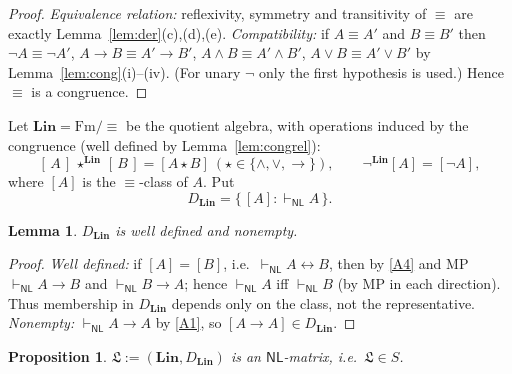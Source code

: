 \documentclass[12pt]{article}
\newtheorem{lemma}{Lemma}
\newtheorem{proposition}{Proposition}
\theoremstyle{definition}
\newcommand{\NL}{\mathsf{NL}}
\newcommand{\prv}{\vdash_{\NL}}
\newcommand{\Fm}{\mathrm{Fm}}
\newcommand{\imp}{\rightarrow}
\newcommand{\bic}{\leftrightarrow}
\newcommand{\Lin}{\mathbf{Lin}}
\begin{document}
\begin{proof}
\emph{Equivalence relation:} reflexivity, symmetry and transitivity of $\equiv$
are exactly Lemma~\ref{lem:der}(c),(d),(e).
\emph{Compatibility:} if $A\equiv A'$ and $B\equiv B'$ then
$\neg A\equiv\neg A'$, $A\imp B\equiv A'\imp B'$, $A\wedge B\equiv A'\wedge B'$,
$A\vee B\equiv A'\vee B'$ by Lemma~\ref{lem:cong}(i)--(iv). (For unary $\neg$
only the first hypothesis is used.) Hence $\equiv$ is a congruence.
\end{proof}

Let $\Lin=\Fm/{\equiv}$ be the quotient algebra, with operations induced by the
congruence (well defined by Lemma~\ref{lem:congrel}):
\[
[\,A\,]\,\star^{\Lin}\,[\,B\,]=[A\star B]\ (\star\in\{\wedge,\vee,\imp\}),
\qquad \neg^{\Lin}[A]=[\neg A],
\]
where $[A]$ is the $\equiv$-class of $A$. Put
\[
D_{\Lin}=\{\,[A] : \prv A\,\}.
\]

\begin{lemma}\label{lem:Dwelldef}
$D_{\Lin}$ is well defined and nonempty.
\end{lemma}

\begin{proof}
\emph{Well defined:} if $[A]=[B]$, i.e.\ $\prv A\bic B$, then by \eqref{A4} and
MP $\prv A\imp B$ and $\prv B\imp A$; hence $\prv A$ iff $\prv B$
(by MP in each direction). Thus membership in $D_{\Lin}$ depends only on the
class, not the representative. \emph{Nonempty:} $\prv A\imp A$ by \eqref{A1}, so
$[A\imp A]\in D_{\Lin}$.
\end{proof}

\begin{proposition}\label{prop:LTmatrix}
$\mathfrak L:=(\Lin,D_{\Lin})$ is an $\NL$-matrix, i.e.\ $\mathfrak L\in S$.
\end{proposition}
\end{document}
